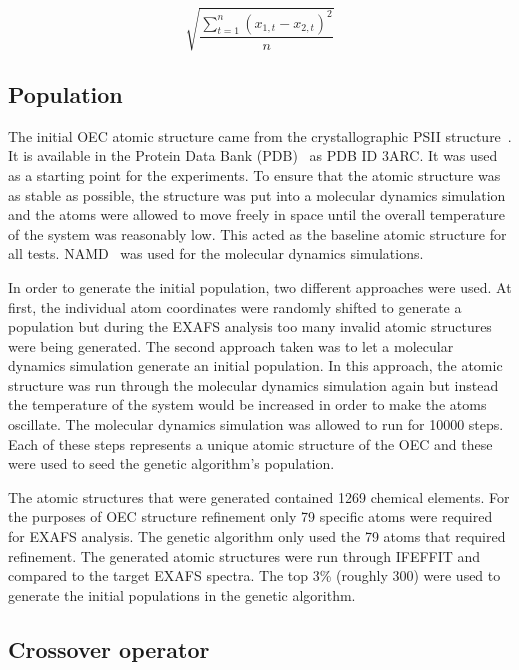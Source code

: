\documentclass[conference]{IEEEtran}
\begin{document}
\begin{equation}
  \label{eq:rmsdFormula}
  \sqrt{\frac{\sum_{t=1}^{n} \left ( x_{1,t}-x_{2,t} \right )^{2}}{n}}
\end{equation}

\subsection{Population}
\label{sec:population}

The initial OEC atomic structure came from the crystallographic PSII structure~\cite{umena2011crystal}. It is available in the Protein Data Bank (PDB)~\cite{databank} as PDB ID 3ARC. It was used as a starting point for the experiments. To ensure that the atomic structure was as stable as possible, the structure was put into a molecular dynamics simulation and the atoms were allowed to move freely in space until the overall temperature of the system was reasonably low. This acted as the baseline atomic structure for all tests. NAMD~\cite{namd} was used for the molecular dynamics simulations.

In order to generate the initial population, two different approaches were used. At first, the individual atom coordinates were randomly shifted to generate a population but during the EXAFS analysis too many invalid atomic structures were being generated. The second approach taken was to let a molecular dynamics simulation generate an initial population. In this approach, the atomic structure was run through the molecular dynamics simulation again but instead the temperature of the system would be increased in order to make the atoms oscillate. The molecular dynamics simulation was allowed to run for 10000 steps. Each of these steps represents a unique atomic structure of the OEC and these were used to seed the genetic algorithm's population.

The atomic structures that were generated contained 1269 chemical elements. For the purposes of OEC structure refinement only 79 specific atoms were required for EXAFS analysis. The genetic algorithm only used the 79 atoms that required refinement. The generated atomic structures were run through IFEFFIT and compared to the target EXAFS spectra. The top 3\% (roughly 300) were used to generate the initial populations in the genetic algorithm.

\subsection{Crossover operator}
\end{document}
